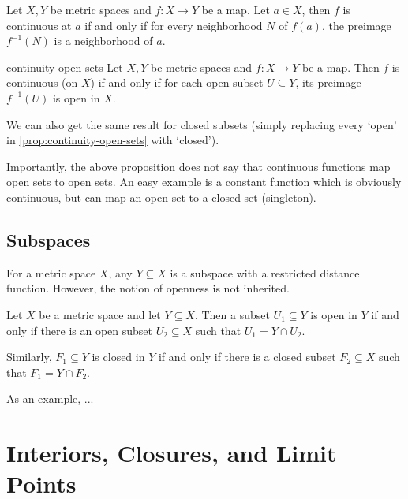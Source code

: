 \documentclass{styles/tufte}
\begin{document}
  \begin{proposition}{}{}
    Let $X, Y$ be metric spaces and $f: X \to Y$ be a map. Let $a \in X$, then $f$ is continuous at $a$ if and only if for every neighborhood $N$ of $f(a)$, the preimage $f^{-1}(N)$ is a neighborhood of $a$.
  \end{proposition}
  
  \begin{proposition}{}{continuity-open-sets}
    Let $X, Y$ be metric spaces and $f: X \to Y$ be a map. Then $f$ is continuous (on $X$) if and only if for each open subset $U \subseteq Y$, its preimage $f^{-1}(U)$ is open in $X$.
  \end{proposition}
  
  We can also get the same result for closed subsets (simply replacing every `open' in \cref{prop:continuity-open-sets} with `closed').
  
  Importantly, the above proposition does not say that continuous functions map open sets to open sets. An easy example is a constant function which is obviously continuous, but can map an open set to a closed set (singleton).
  
  
\subsection{Subspaces}
  
  For a metric space $X$, any $Y \subseteq X$ is a subspace with a restricted distance function. However, the notion of openness is not inherited.
  
  \begin{lemma}{}{}
    Let $X$ be a metric space and let $Y \subseteq X$. Then a subset $U_1 \subseteq Y$ is open in $Y$ if and only if there is an open subset $U_2 \subseteq X$ such that $U_1 = Y \cap U_2$.
    
    Similarly, $F_1 \subseteq Y$ is closed in $Y$ if and only if there is a closed subset $F_2 \subseteq X$ such that $F_1 = Y \cap F_2$.
  \end{lemma}
  
  As an example, ...





\section{Interiors, Closures, and Limit Points}
\end{document}
